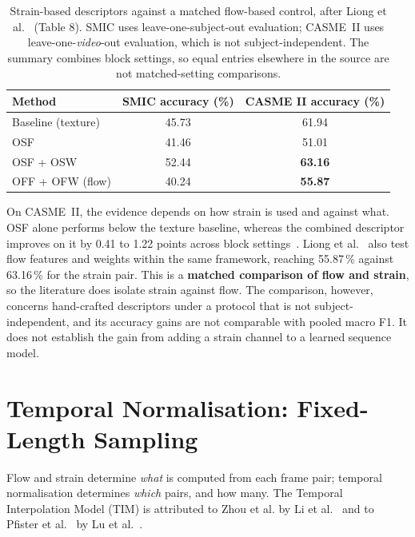 \begin{table}[htbp]
	\centering
	\small
	\begin{tabular}{@{}lcc@{}}
		\hline
		\textbf{Method} & \textbf{SMIC accuracy (\%)} & \textbf{CASME II accuracy (\%)} \\
		\hline
		Baseline (texture) & 45.73 & 61.94 \\
		OSF                & 41.46 & 51.01 \\
		OSF + OSW          & 52.44 & \textbf{63.16} \\
		OFF + OFW (flow)   & 40.24 & \textbf{55.87} \\
		\hline
	\end{tabular}
	\caption[Strain-based descriptors against a matched flow control]{Strain-based descriptors against a matched flow-based control, after Liong et al.~\cite{liong2016} (Table 8). SMIC uses leave-one-subject-out evaluation; CASME~II uses leave-one-\textit{video}-out evaluation, which is not subject-independent. The summary combines block settings, so equal entries elsewhere in the source are not matched-setting comparisons.}
	\label{tab:strain-performance}
\end{table}

On CASME~II, the evidence depends on how strain is used and against what. OSF alone performs below the texture baseline, whereas the combined descriptor improves on it by 0.41 to 1.22 points across block settings~\cite{liong2016}. Liong et al.~\cite{liong2016} also test flow features and weights within the same framework, reaching 55.87\,\% against 63.16\,\% for the strain pair. This is a \textbf{matched comparison of flow and strain}, so the literature does isolate strain against flow. The comparison, however, concerns hand-crafted descriptors under a protocol that is not subject-independent, and its accuracy gains are not comparable with pooled macro F1. It does not establish the gain from adding a strain channel to a learned sequence model.


\section{Temporal Normalisation: Fixed-Length Sampling}
\label{sec:tim-review}

Flow and strain determine \textit{what} is computed from each frame pair; temporal normalisation determines \textit{which} pairs, and how many. The Temporal Interpolation Model (TIM) is attributed to Zhou et al. by Li et al.~\cite{liX2013,liX2018} and to Pfister et al.~\cite{pfister2011} by Lu et al.~\cite{lu2015}.

